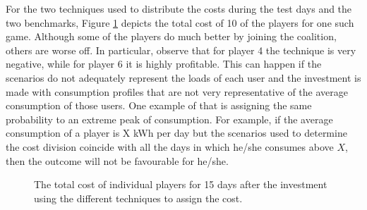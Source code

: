 For the two techniques used to distribute the costs during the test days and the two benchmarks, Figure \ref{fig:performance1} depicts the total cost of 10 of the players for one such game. Although some of the players do much better by joining the coalition, others are worse off.
In particular, observe that for player 4 the technique is very negative, while for player 6 it is highly profitable. This can happen if the scenarios do not adequately represent the loads of each user and the investment is made with consumption profiles that are not very representative of the average consumption of those users. One example of that is assigning the same probability to an extreme peak of consumption.  For example, if the average consumption of a player is X kWh per day but the scenarios used to determine the cost division coincide with all the days in which he/she consumes above $X$, then the outcome will not be favourable for he/she.
\begin{figure}[h]


  \caption{The total cost of individual players for 15 days after the investment using the different techniques to assign the cost.}
  \label{fig:performance1}
\end{figure}

